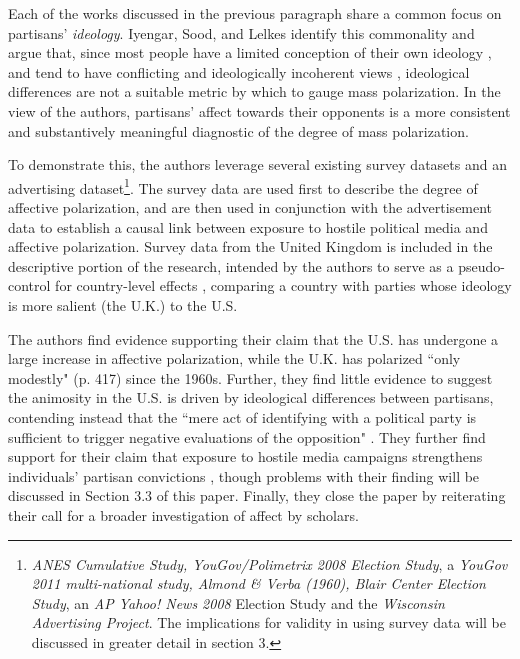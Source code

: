 \documentclass[12pt]{article}
\begin{document}
Each of the works discussed in the previous paragraph share a common focus on partisans' \textit{ideology}. Iyengar, Sood, and Lelkes identify this commonality and argue that, since most people have a limited conception of their own ideology \citep{converse1964nature}, and tend to have conflicting \citep{mcclosky1984american} and ideologically incoherent views \citep[p. 76--96]{zaller1992nature}, ideological differences are not a suitable metric by which to gauge mass polarization. In the view of the authors, partisans' affect towards their opponents is a more consistent and substantively meaningful diagnostic of the degree of mass polarization.

To demonstrate this, the authors leverage several existing survey datasets and an advertising dataset\footnote{\textit{ANES Cumulative Study, YouGov/Polimetrix 2008 Election Study}, a \textit{YouGov 2011 multi-national study, Almond \& Verba (1960), Blair Center Election Study}, an \textit{AP Yahoo! News 2008} Election Study and the \textit{Wisconsin Advertising Project}. The implications for validity in using survey data will be discussed in greater detail in section 3.}. The survey data are used first to describe the degree of affective polarization, and are then used in conjunction with the advertisement data to establish a causal link between exposure to hostile political media and affective polarization. Survey data from the United Kingdom is included in the descriptive portion of the research, intended by the authors to serve as a pseudo-control for country-level effects \citep[p. 407]{iyengar2012affect}, comparing a country with parties whose ideology is more salient (the U.K.) to the U.S.

The authors find evidence supporting their claim that the U.S. has undergone a large increase in affective polarization, while the U.K. has polarized ``only modestly" (p. 417) since the 1960s. Further, they find little evidence to suggest the animosity in the U.S. is driven by ideological differences between partisans, contending instead that the ``mere act of identifying with a political party is sufficient to trigger negative evaluations of the opposition" \citep[p. 407]{iyengar2012affect}. They further find support for their claim that exposure to hostile media campaigns strengthens individuals' partisan convictions \citep[p. 407]{iyengar2012affect}, though problems with their finding will be discussed in Section 3.3 of this paper. Finally, they close the paper by reiterating their call for a broader investigation of affect by scholars.
\end{document}
